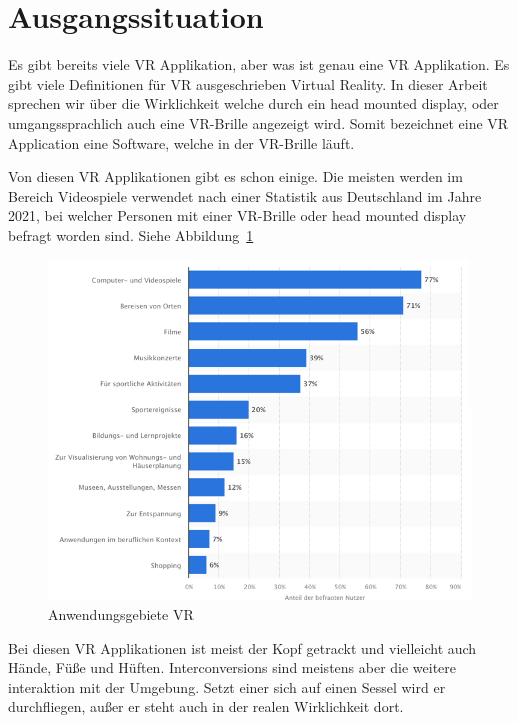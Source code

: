 \section{Ausgangssituation}\label{sec: initial_situation}

Es gibt bereits viele VR Applikation, aber was ist genau eine VR Applikation.
Es gibt viele Definitionen für VR ausgeschrieben Virtual Reality.
In dieser Arbeit sprechen wir über die Wirklichkeit welche durch ein head mounted display, oder umgangssprachlich auch eine VR-Brille angezeigt wird.
Somit bezeichnet eine VR Application eine Software, welche in der VR-Brille läuft.

Von diesen VR Applikationen gibt es schon einige.
Die meisten werden im Bereich Videospiele verwendet nach einer Statistik aus Deutschland im Jahre 2021, bei welcher Personen mit einer VR-Brille oder head mounted display befragt worden sind.
Siehe Abbildung~\ref{fig:statistic_usage_vr}~\cite{BITKOM_2021}

\begin{figure}
    \includegraphics[scale=0.5]{pics/statistic_usage_vr}
    \caption{Anwendungsgebiete VR}
    \label{fig:statistic_usage_vr}
\end{figure}

Bei diesen VR Applikationen ist meist der Kopf getrackt und vielleicht auch Hände, Füße und Hüften.
Interconversions sind meistens aber die weitere interaktion mit der Umgebung.
Setzt einer sich auf einen Sessel wird er durchfliegen, außer er steht auch in der realen Wirklichkeit dort.

